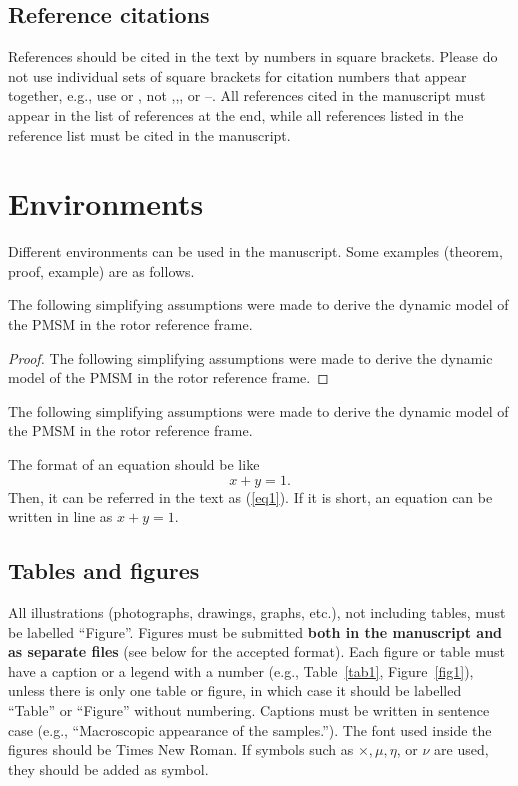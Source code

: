 \documentclass{elektr}
\begin{document}
\subsection{Reference citations}
References should be cited in the text by numbers in square brackets. Please do not use individual sets of square brackets for citation numbers that appear together, e.g., use \cite{ref1,ref4} or \cite{ref1,ref2,ref3,ref5}, not \cite{ref1},\cite{ref2},\cite{ref3}, or \cite{ref4}--\cite{ref6}. All references cited in the manuscript must appear in the list of references at the end, while all references listed in the reference list must be cited in the manuscript.

\section{Environments}
Different environments can be used in the manuscript. Some examples (theorem, proof, example) are as follows.

\begin{theorem} \label{the1}
The following simplifying assumptions were made to derive the dynamic model of the PMSM in the rotor reference frame.
\end{theorem}

\begin{proof}
The following simplifying assumptions were made to derive the dynamic model of the PMSM in the rotor reference frame.
\end{proof}

\begin{example}\label{exm1}
The following simplifying assumptions were made to derive the dynamic model of the PMSM in the rotor reference frame.
\end{example}

The format of an equation should be like
\begin{equation}
\label{eq1}
x+y = 1.
\end{equation}
Then, it can be referred in the text as (\ref{eq1}). If it is short, an equation can be written in line as $x+y=1$.


\subsection{Tables and figures}
All illustrations (photographs, drawings, graphs, etc.), not including tables, must be labelled ``Figure''. Figures must be submitted \textbf{both in the manuscript and as separate files} (see below for the accepted format). Each figure or table must have a caption or a legend with a number (e.g., Table~\ref{tab1}, Figure~\ref{fig1}), unless there is only one table or figure, in which case it should be labelled ``Table'' or ``Figure'' without numbering. Captions must be written in sentence case (e.g., ``Macroscopic appearance of the samples.''). The font used inside the figures should be Times New Roman. If symbols such as $\times, \mu, \eta$, or $\nu$ are used, they should be added as symbol.
\end{document}
